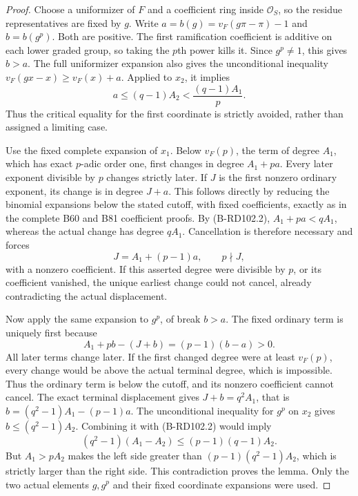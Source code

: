 \begin{proof}
Choose a uniformizer of $F$ and a coefficient ring
inside $\mathcal O_S$, so the residue representatives
are fixed by $g$. Write
$a=b(g)=v_F(g\pi-\pi)-1$ and
$b=b(g^p)$. Both are positive.
The first ramification coefficient is additive on
each lower graded group, so taking the $p$th power
kills it. Since $g^p\ne1$, this gives $b>a$.
The full uniformizer expansion also gives the
unconditional inequality
$v_F(gx-x)\ge v_F(x)+a$.
Applied to $x_2$, it implies
\[
                a\le(q-1)A_2<\frac{(q-1)A_1}{p}.
                                                        \tag{B-RD102.2}
\]
Thus the critical equality for the first coordinate
is strictly avoided, rather than assigned a limiting case.

Use the fixed complete expansion of $x_1$.
Below $v_F(p)$, the term of degree $A_1$, which has
exact $p$-adic order one, first changes in degree
$A_1+pa$. Every later exponent divisible by $p$
changes strictly later. If $J$ is the first nonzero
ordinary exponent, its change is in degree $J+a$.
This follows directly by reducing the binomial expansions
below the stated cutoff, with fixed coefficients, exactly
as in the complete B60 and B81 coefficient proofs.
By (B-RD102.2), $A_1+pa<qA_1$, whereas the actual
change has degree $qA_1$. Cancellation is therefore
necessary and forces
\[
                     J=A_1+(p-1)a,\qquad p\nmid J ,
                                                        \tag{B-RD102.3}
\]
with a nonzero coefficient. If this asserted degree
were divisible by $p$, or its coefficient vanished,
the unique earliest change could not cancel, already
contradicting the actual displacement.

Now apply the same expansion to $g^p$, of break $b>a$.
The fixed ordinary term is uniquely first because
\[
             A_1+pb-(J+b)=(p-1)(b-a)>0 .
                                                        \tag{B-RD102.4}
\]
All later terms change later. If the first changed
degree were at least $v_F(p)$, every change would be
above the actual terminal degree, which is impossible.
Thus the ordinary term is below the cutoff, and its
nonzero coefficient cannot cancel. The exact terminal
displacement gives
$J+b=q^2A_1$, that is
$b=(q^2-1)A_1-(p-1)a$.
The unconditional inequality for $g^p$ on $x_2$
gives $b\le(q^2-1)A_2$. Combining it with (B-RD102.2)
would imply
\[
 (q^2-1)(A_1-A_2)\le(p-1)(q-1)A_2 .
                                                        \tag{B-RD102.5}
\]
But $A_1>pA_2$ makes the left side greater than
$(p-1)(q^2-1)A_2$, which is strictly larger than
the right side. This contradiction proves the lemma.
Only the two actual elements $g,g^p$ and their
fixed coordinate expansions were used.
\end{proof}

